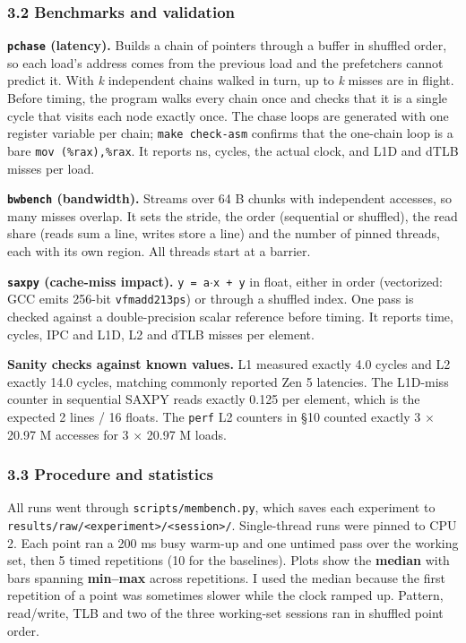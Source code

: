 \documentclass[10pt,letterpaper]{article}
\begin{document}
\hypertarget{benchmarks-and-validation}{%
\subsubsection{3.2 Benchmarks and
validation}\label{benchmarks-and-validation}}

\textbf{\texttt{pchase} (latency).} Builds a chain of
pointers through a buffer in shuffled order, so each load's
address comes from the previous load and the prefetchers
cannot predict it. With \emph{k} independent chains walked
in turn, up to \emph{k} misses are in flight. Before timing,
the program walks every chain once and checks that it is a
single cycle that visits each node exactly once. The chase
loops are generated with one register variable per chain;
\texttt{make\ check-asm} confirms that the one-chain loop is
a bare \texttt{mov\ (\%rax),\%rax}. It reports ns, cycles,
the actual clock, and L1D and dTLB misses per load.

\textbf{\texttt{bwbench} (bandwidth).} Streams over 64 B
chunks with independent accesses, so many misses overlap. It
sets the stride, the order (sequential or shuffled), the
read share (reads sum a line, writes store a line) and the
number of pinned threads, each with its own region. All
threads start at a barrier.

\textbf{\texttt{saxpy} (cache-miss impact).}
\texttt{y\ =\ a$\cdot$x\ +\ y} in float, either in order
(vectorized: GCC emits 256-bit \texttt{vfmadd213ps}) or
through a shuffled index. One pass is checked against a
double-precision scalar reference before timing. It reports
time, cycles, IPC and L1D, L2 and dTLB misses per element.

\textbf{Sanity checks against known values.} L1 measured
exactly 4.0 cycles and L2 exactly 14.0 cycles, matching
commonly reported Zen 5 latencies. The L1D-miss counter in
sequential SAXPY reads exactly 0.125 per element, which is
the expected 2 lines / 16 floats. The \texttt{perf} L2
counters in §10 counted exactly 3 $\times$ 20.97 M accesses for 3 $\times$
20.97 M loads.

\hypertarget{procedure-and-statistics}{%
\subsubsection{3.3 Procedure and
statistics}\label{procedure-and-statistics}}

All runs went through \texttt{scripts/membench.py}, which
saves each experiment to
\texttt{results/raw/\textless{}experiment\textgreater{}/\textless{}session\textgreater{}/}.
Single-thread runs were pinned to CPU 2. Each point ran a
200 ms busy warm-up and one untimed pass over the working
set, then 5 timed repetitions (10 for the baselines). Plots
show the \textbf{median} with bars spanning
\textbf{min--max} across repetitions. I used the median
because the first repetition of a point was sometimes slower
while the clock ramped up. Pattern, read/write, TLB and two
of the three working-set sessions ran in shuffled point
order.
\end{document}
